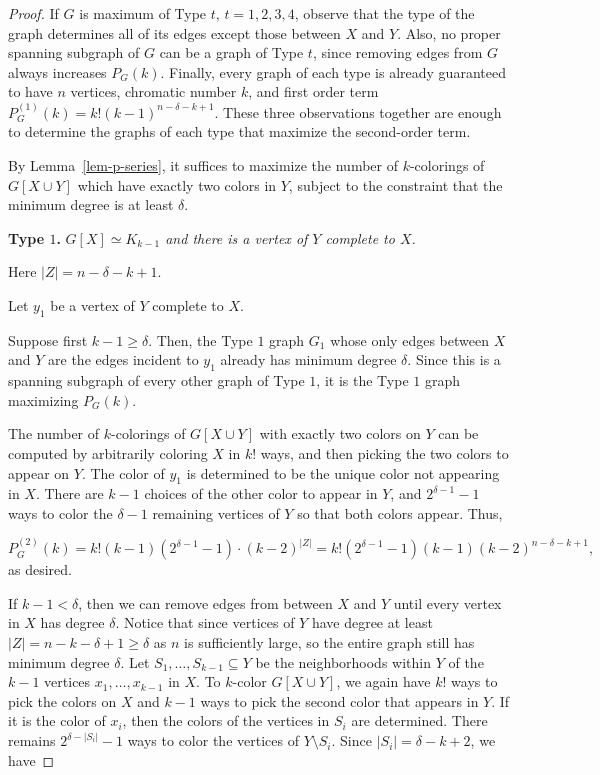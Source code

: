 \documentclass[11pt]{article}
\theoremstyle{plain}
\theoremstyle{definition}
\theoremstyle{remark}
\begin{document}
\begin{proof}
If $G$ is maximum of Type $t$, $t=1,2,3,4$, observe that the type of the graph determines all of its edges except those between $X$ and $Y$. Also, no proper spanning subgraph of $G$ can be a graph of Type $t$, since removing edges from $G$ always increases $P_G(k)$. Finally, every graph of each type is already guaranteed to have $n$ vertices, chromatic number $k$, and first order term $P_G^{(1)}(k) = k!(k-1)^{n-\delta - k + 1}$. These three observations together are enough to determine the graphs of each type that maximize the second-order term.

By Lemma~\ref{lem-p-series}, it suffices to maximize the number of $k$-colorings of $G[X\cup Y]$ which have exactly two colors in $Y$, subject to the constraint that the minimum degree is at least $\delta$.

\bigskip

\noindent \textbf{Type $1$.} {\em $G[X]\simeq K_{k-1}$ and there is a vertex of $Y$ complete to $X$.}

Here $|Z| = n-\delta-k+1$.

Let $y_1$ be a vertex of $Y$ complete to $X$.

Suppose first $k - 1 \ge \delta$. Then, the Type $1$ graph $G_1$ whose only edges between $X$ and $Y$ are the edges incident to $y_1$ already has minimum degree $\delta$. Since this is a spanning subgraph of every other graph of Type $1$, it is the Type $1$ graph maximizing $P_G(k)$.

The number of $k$-colorings of $G[X\cup Y]$ with exactly two colors on $Y$ can be computed by arbitrarily coloring $X$ in $k!$ ways, and then picking the two colors to appear on $Y$. The color of $y_1$ is determined to be the unique color not appearing in $X$. There are $k-1$ choices of the other color to appear in $Y$, and $2^{\delta-1} - 1$ ways to color the $\delta - 1$ remaining vertices of $Y$ so that both colors appear. Thus,

\[
P_G^{(2)}(k) = k!(k-1)(2^{\delta - 1} - 1) \cdot (k-2)^{|Z|} = k!(2^{\delta - 1} - 1)(k-1)(k-2)^{n-\delta - k + 1},
\]
as desired.

If $k-1 < \delta$, then we can remove edges from between $X$ and $Y$ until every vertex in $X$ has degree $\delta$. Notice that since vertices of $Y$ have degree at least $|Z| = n-k-\delta+1\ge \delta$ as $n$ is sufficiently large, so the entire graph still has minimum degree $\delta$. Let $S_1,\ldots, S_{k-1}\subseteq Y$ be the neighborhoods within $Y$ of the $k-1$ vertices $x_1,\ldots ,x_{k-1}$ in $X$. To $k$-color $G[X\cup Y]$, we again have $k!$ ways to pick the colors on $X$ and $k-1$ ways to pick the second color that appears in $Y$. If it is the color of $x_i$, then the colors of the vertices in $S_i$ are determined. There remains $2^{\delta - |S_i|} - 1$ ways to color the vertices of $Y\setminus S_i$. Since $|S_i| = \delta - k + 2$, we have


\end{proof}
\end{document}
